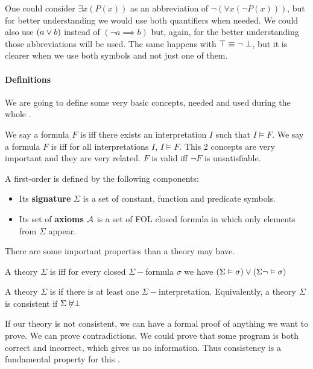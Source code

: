 One could consider $\exists x(P(x))$  as an abbreviation of $\neg (\forall x(\neg P(x)))$, but for better understanding we would use both quantifiers when needed.
We could also use $(a \vee b)$ instead of $(\neg a \implies b)$ but, again, for the better understanding those abbreviations will be used.
The same happens with $\top \equiv \neg \perp$, but it is clearer when we use both symbols and not just one of them.


\paragraph{Definitions}

We are going to define some very basic concepts, needed and used during the whole \thisworkmp.

We say a formula $F$ is  \gls{iff} there exists an interpretation $I$ such that $I \vDash F$. 
%
We say a formula $F$ is  \gls{iff} for all interpretations $I$, $I\vDash F$.
\label{def:validity}
This 2 concepts are very important and they are very related. $F$ is valid \gls{iff} $\neg F$ is unsatisfiable. 


A first-order  is defined by the following components: 
\begin{itemize}
	\item Its \textbf{signature} $\Sigma$ is a set of constant, function and predicate symbols.
	\item Its set of \textbf{axioms} $\mathcal{A}$ is a set of \gls{FOL} closed formula in which only elements from $\Sigma$ appear.
\end{itemize}



There are some important properties than a theory may have. 

A theory $\Sigma$ is  \gls{iff} for every closed $\Sigma-$formula $\sigma$ we have $(\Sigma\vDash \sigma) \vee (\Sigma\neg\vDash \sigma) $

A theory $\Sigma$ is  if there is at least one $\Sigma-$interpretation.	Equivalently, a theory $\Sigma$ is consistent if $\Sigma \not\vDash \perp$

If our theory is not consistent, we can have a formal proof of anything we want to prove. 
%
We can prove contradictions. 
%
We could prove that some program is both correct and incorrect, which gives us no information. 
%
Thus consistency is a fundamental property for this \thisworkm.

